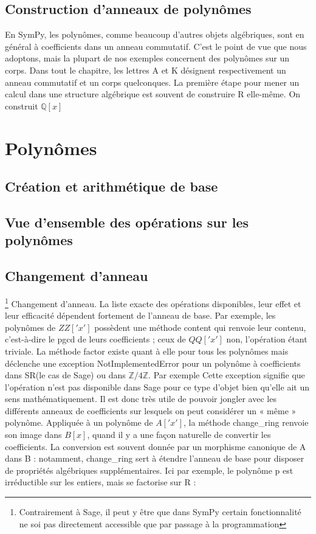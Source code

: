   \subsection{ Construction d’anneaux de polynômes}
En SymPy, les polynômes, comme beaucoup d’autres objets algébriques, sont en général à coefficients dans un anneau commutatif. C’est le point de vue que nous adoptons, mais la plupart de nos exemples concernent des polynômes sur un corps. Dans tout le chapitre, les lettres A et K désignent respectivement un anneau commutatif et un corps quelconques. La première étape pour mener un calcul dans une structure algébrique est souvent de construire R elle-même. On construit $\mathbb{Q}\left[x\right]$
 \section{Polynômes}
  \subsection{Création et arithmétique de base}
  \subsection{Vue d’ensemble des opérations sur les polynômes}
  \subsection{Changement d’anneau}\footnote{Contrairement à Sage, il peut y être que dans SymPy certain 
  fonctionnalité ne soi pas directement accessible que par passage à la programmation }
Changement d’anneau. La liste exacte des opérations disponibles, leur effet
et leur efficacité dépendent fortement de l’anneau de base. Par exemple, les
polynômes de $ZZ\left['x'\right]$ possèdent une méthode content qui renvoie leur contenu,
c’est-à-dire le pgcd de leurs coefficients ; ceux de $QQ\left['x'\right]$ non, l’opération étant
triviale. La méthode factor existe quant à elle pour tous les polynômes mais
déclenche une exception NotImplementedError pour un polynôme à coefficients
dans SR(le cas de Sage) ou dans $\mathbb{Z}/4\mathbb{Z}$. Par exemple Cette exception signifie que l’opération n’est pas disponible dans Sage pour ce type d’objet bien qu’elle ait un sens mathématiquement.
Il est donc très utile de pouvoir jongler avec les différents anneaux de coefficients
sur lesquels on peut considérer un « même » polynôme. Appliquée à un polynôme
de $A\left['x'\right]$, la méthode change\_ring renvoie son image dans $B\left[x\right]$, quand il y a une
façon naturelle de convertir les coefficients. La conversion est souvent donnée par
un morphisme canonique de A dans B : notamment, change\_ring sert à étendre
l’anneau de base pour disposer de propriétés algébriques supplémentaires. Ici par
exemple, le polynôme p est irréductible sur les entiers, mais se factorise sur R :
